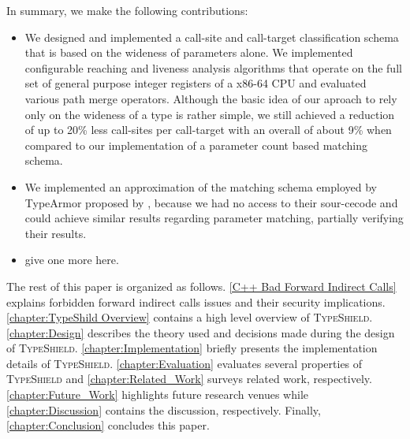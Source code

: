 In summary, we make the following contributions:
\label{Contribution}
\begin{itemize}
 \item We designed and implemented a call-site and call-target classification schema
 that is based on the wideness of parameters alone. We implemented configurable reaching and liveness analysis algorithms
 that operate on the full set of general purpose integer registers of a x86-64 CPU and evaluated various path merge operators.
 Although the basic idea of our aproach to rely only on the wideness of a type is rather simple, we still achieved a reduction
 of up to 20\% less call-sites per call-target with an overall of about 9\% when compared to our implementation of a parameter
 count based matching schema.

 \item We implemented an approximation of the matching schema employed by TypeArmor proposed by \cite{veen:typearmor}, 
 because we had no access to their sour-cecode and could achieve similar results regarding parameter matching, partially verifying
 their results.
 
 \item give one more here.
  
\end{itemize}

\label{Outline}
The rest of this paper is organized as follows.
\cref{C++ Bad Forward Indirect Calls} explains forbidden forward indirect calls issues and their security implications.
\cref{chapter:TypeShild Overview} contains a high level overview of \textsc{TypeShield}.
\cref{chapter:Design} describes the theory used and decisions made during the design of \textsc{TypeShield}.
\cref{chapter:Implementation} briefly presents the implementation details of \textsc{TypeShield}.
\cref{chapter:Evaluation} evaluates several properties of \textsc{TypeShield} and
\cref{chapter:Related_Work} surveys related work, respectively.
\cref{chapter:Future_Work} highlights future research venues while 
\cref{chapter:Discussion} contains the discussion, respectively.
Finally, \cref{chapter:Conclusion} concludes this paper.


